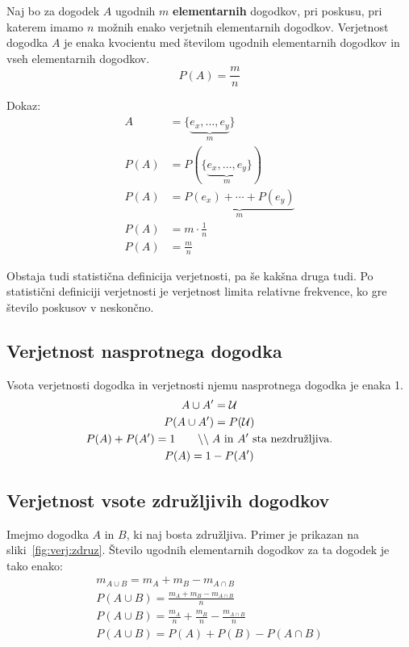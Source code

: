 \documentclass[a4paper,oneside,12pt,fleqn]{article}
\newcommand\krat\cdot
\newcommand{\comment}[1]{\ensuremath{\qquad\backslash\backslash\;}\textnormal{#1}}
\numberwithin{equation}{section}
\begin{document}
Naj bo za dogodek $A$ ugodnih $m$ \textbf{elementarnih} dogodkov, pri poskusu, pri katerem imamo
$n$ možnih enako verjetnih elementarnih dogodkov. Verjetnost dogodka $A$ je enaka
kvocientu med številom ugodnih elementarnih dogodkov in vseh elementarnih dogodkov.
\[ P(A) = \frac{m}{n} \]

Dokaz:
\begin{align*}
  A &= \{\underbrace{e_x, \ldots, e_y}_m\} \\
  P(A) &= P(\{\underbrace{e_x, \ldots, e_y}_m\}) \\
  P(A) &= \underbrace{P(e_x) + \cdots + P(e_y)}_m \\
  P(A) &= m \krat \frac{1}{n} \\
  P(A) &= \frac{m}{n}
\end{align*}

Obstaja tudi statistična definicija verjetnosti, pa še kakšna druga tudi. Po statistični
definiciji verjetnosti je verjetnost limita relativne frekvence, ko gre število poskusov v
neskončno.

\subsection{Verjetnost nasprotnega dogodka}
\label{sec:verj:nasp}
Vsota verjetnosti dogodka in verjetnosti njemu nasprotnega dogodka je enaka 1.
\begin{gather*}
  A \cup A' = \mathcal U \\
  P(A \cup A') = P(\mathcal U) \\
  P(A) + P(A') = 1 \comment{$A$ in $A'$ sta nezdružljiva.} \\
  P(A) = 1 - P(A')
\end{gather*}

\subsection{Verjetnost vsote združljivih dogodkov}
\label{sec:verj:zdruz}

Imejmo dogodka $A$ in $B$, ki naj bosta združljiva. Primer je prikazan na
sliki~\ref{fig:verj:zdruz}.
Število ugodnih elementarnih dogodkov za ta dogodek je tako enako:
\begin{gather*}
  m_{A\cup B} = m_A + m_B - m_{A\cap B} \\
  P(A \cup B) = \frac{m_A + m_B - m_{A\cap B}}{n} \\
  P(A \cup B) = \frac{m_A}{n} + \frac{m_B}{n} - \frac{m_{A\cap B}}{n} \\
  P(A \cup B) = P(A) + P(B) - P(A\cap B)
\end{gather*}
\end{document}
